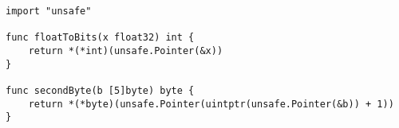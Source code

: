 \begin{lstlisting}[language=Golang, label=lst:unsafe-examples, caption=Usage examples of the Go unsafe API]
import "unsafe"

func floatToBits(x float32) int {
    return *(*int)(unsafe.Pointer(&x))
}

func secondByte(b [5]byte) byte {
    return *(*byte)(unsafe.Pointer(uintptr(unsafe.Pointer(&b)) + 1))
}
\end{lstlisting}